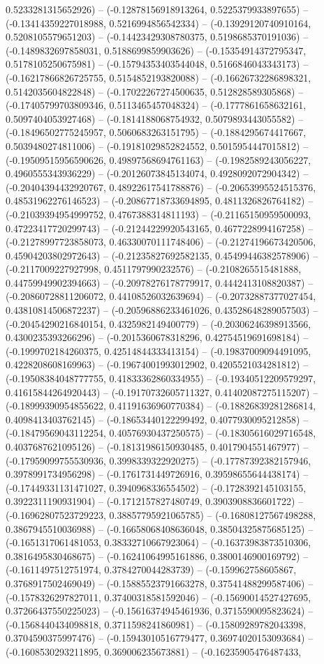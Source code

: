 0.5233281315652926) -- (-0.12878156918913264, 0.5225379933897655) -- (-0.13414359227018988, 0.5216994856542334) -- (-0.13929120740910164, 0.5208105579651203) -- (-0.14423429308780375, 0.5198685370191036) -- (-0.1489832697858031, 0.5188699859903626) -- (-0.15354914372795347, 0.5178105250675981) -- (-0.15794353403544048, 0.5166846043343173) -- (-0.16217866826725755, 0.5154852193820088) -- (-0.16626732286898321, 0.5142035604822848) -- (-0.17022267274500635, 0.512828589305868) -- (-0.17405799703809346, 0.5113465457048324) -- (-0.1777861658632161, 0.5097404053927468) -- (-0.1814188068754932, 0.5079893443055582) -- (-0.18496502775245957, 0.5060683263151795) -- (-0.1884295674417667, 0.5039480274811006) -- (-0.19181029852824552, 0.5015954447015812) -- (-0.19509515956590626, 0.49897568694761163) -- (-0.1982589243056227, 0.4960555343936229) -- (-0.20126073845134074, 0.4928092072904342) -- (-0.20404394432920767, 0.48922617541788876) -- (-0.20653995524515376, 0.48531962276146523) -- (-0.20867718733694895, 0.4811326826764182) -- (-0.21039394954999752, 0.4767388314811193) -- (-0.21165150959500093, 0.47223417720299743) -- (-0.21244229920543165, 0.4677228994167258) -- (-0.21278997723858073, 0.46330070111748406) -- (-0.21274196673420506, 0.45904203802972643) -- (-0.21235827692582135, 0.45499446382578906) -- (-0.2117009227927998, 0.4511797990232576) -- (-0.2108265515481888, 0.44759949902394663) -- (-0.20978276178779917, 0.4442413108820387) -- (-0.20860728811206072, 0.44108526032639694) -- (-0.20732887377027454, 0.43810814506872237) -- (-0.20596886233461026, 0.43528648289057503) -- (-0.20454290216840154, 0.4325982149400779) -- (-0.20306246398913566, 0.4300235393266296) -- (-0.2015360678318296, 0.42754519691698184) -- (-0.1999702184260375, 0.42514844333413154) -- (-0.19837009094491095, 0.4228208608169963) -- (-0.19674001993012902, 0.4205521034281812) -- (-0.19508384048777755, 0.41833362860334955) -- (-0.19340512209579297, 0.41615844264920443) -- (-0.19170732605711327, 0.41402087275115207) -- (-0.18999390954855622, 0.41191636960770384) -- (-0.18826839281286814, 0.4098413403762145) -- (-0.18653440122299492, 0.4077930095212858) -- (-0.18479569043112254, 0.40576930437250575) -- (-0.18305616029716548, 0.4037687621095126) -- (-0.18131986150930485, 0.4017904551467977) -- (-0.17959099755530936, 0.3998339322920275) -- (-0.17787392382157946, 0.3978991734956298) -- (-0.1761731449726916, 0.39598655644438174) -- (-0.17449331131471027, 0.3940968336554502) -- (-0.1728392145103155, 0.3922311190931904) -- (-0.1712157827480749, 0.3903908836601722) -- (-0.16962807523729223, 0.38857795921065785) -- (-0.16808127567498288, 0.3867945510036988) -- (-0.16658068408636048, 0.38504325875685125) -- (-0.1651317061481053, 0.38332710667923064) -- (-0.16373983873510306, 0.3816495830468675) -- (-0.16241064995161886, 0.3800146900169792) -- (-0.1611497512751974, 0.3784270044283739) -- (-0.159962758605867, 0.3768917502469049) -- (-0.15885523791663278, 0.37541488299587406) -- (-0.1578326297827011, 0.37400318581592046) -- (-0.15690014527427695, 0.37266437550225023) -- (-0.15616374945461936, 0.3715590095823624) -- (-0.1568440434098818, 0.3711598241860981) -- (-0.15809289782043398, 0.3704590375997476) -- (-0.15943010516779477, 0.36974020153093684) -- (-0.1608530293211895, 0.369006235673881) -- (-0.16235905476487433, 